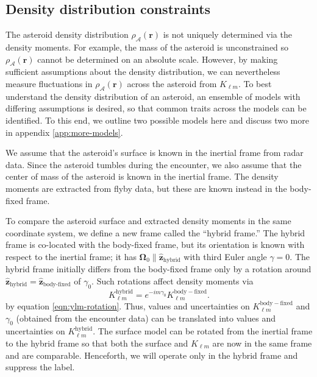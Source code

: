 \documentclass[fleqn,usenatbib]{mnras}
\renewcommand{\unit}[1]{\bm{\hat{#1}}}
\begin{document}
\subsection{Density distribution constraints}
\label{sec:density-distro}

The asteroid density distribution $\rho_\mathcal{A}(\bm r)$ is not uniquely determined via the density moments. For example, the mass of the asteroid is unconstrained so $\rho_\mathcal{A}(\bm r)$ cannot be determined on an absolute scale. However, by making sufficient assumptions about the density distribution, we can nevertheless measure fluctuations in $\rho_\mathcal{A}(\bm r)$ across the asteroid from $K_{\ell m}$. To best understand the density distribution of an asteroid, an ensemble of models with differing assumptions is desired, so that common traits across the models can be identified. To this end, we outline two possible models here and discuss two more in appendix \ref{app:more-models}.

We assume that the asteroid's surface is known in the inertial frame from radar data. Since the asteroid tumbles during the encounter, we also assume that the center of mass of the asteroid is known in the inertial frame. The density moments are extracted from flyby data, but these are known instead in the body-fixed frame.

To compare the asteroid surface and extracted density moments in the same coordinate system, we define a new frame called the ``hybrid frame.'' The hybrid frame is co-located with the body-fixed frame, but its orientation is known with respect to the inertial frame; it has $\bm \Omega_0 \parallel \unit z_\text{hybrid}$ with third Euler angle $\gamma = 0$. The hybrid frame initially differs from the body-fixed frame only by a rotation around $\unit z_\text{hybrid}=\unit z_\text{body-fixed}$ of $\gamma_0$. Such rotations affect density moments via 
\begin{equation}
  K_{\ell m}^\mathrm{hybrid} = e^{-im\gamma_0}K_{\ell m}^\mathrm{body-fixed}.
  \label{eqn:body-fixed-to-hybrid}
\end{equation}
by equation \ref{eqn:ylm-rotation}. Thus, values and  uncertainties on $K_{\ell m}^\mathrm{body-fixed}$ and $\gamma_0$ (obtained from the encounter data) can be translated into values and uncertainties on $K_{\ell m}^\mathrm{hybrid}$. The surface model can be rotated from the inertial frame to the hybrid frame so that both the surface and $K_{\ell m}$ are now in the same frame and are comparable. Henceforth, we will operate only in the hybrid frame and suppress the label.
\end{document}
